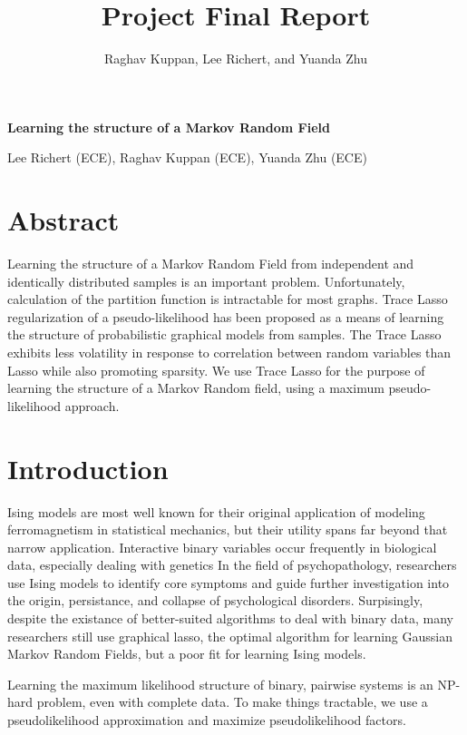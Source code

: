 \documentclass[11pt]{article}
\author{Raghav Kuppan, Lee Richert, and Yuanda Zhu}
\title{Project Final Report}
\begin{document}
\begin{center}
\textbf{\Large Learning the structure of a Markov Random Field}
\end{center}

\begin{center}
Lee Richert (ECE), Raghav Kuppan (ECE), Yuanda Zhu (ECE)
\end{center}



\section{Abstract}
Learning the structure of a Markov Random Field from independent and identically distributed samples is an important problem.
Unfortunately, calculation of the partition function is intractable for most graphs.
Trace Lasso regularization of a pseudo-likelihood has been proposed as a means of learning the structure of probabilistic graphical models from samples. 
The Trace Lasso exhibits less volatility in response to correlation between random variables than Lasso while also promoting sparsity. 
We use Trace Lasso for the purpose of learning the structure of a Markov Random field, using a maximum pseudo-likelihood approach.


\section{Introduction}

Ising models are most well known for their original application of modeling ferromagnetism in statistical mechanics, but their utility spans far beyond that narrow application.
Interactive binary variables occur frequently in biological data, especially dealing with genetics \cite{wang2009learning}\cite{rhemtulla2016network}\cite{mcnally2015mental}
In the field of psychopathology, researchers use Ising models to identify core symptoms and guide further investigation into the origin, persistance, and collapse of psychological disorders\cite{fried2016good}.
Surpisingly, despite the existance of better-suited algorithms to deal with binary data, many researchers still use graphical lasso, the optimal algorithm for learning Gaussian Markov Random Fields, but a poor fit for learning Ising models.

Learning the maximum likelihood structure of binary, pairwise systems is an NP-hard problem, even with complete data.
To make things tractable, we use a pseudolikelihood approximation and maximize pseudolikelihood factors.  
\end{document}
